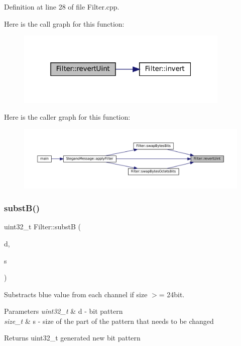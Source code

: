 Definition at line 28 of file Filter.\+cpp.

Here is the call graph for this function\+:\nopagebreak
\begin{figure}[H]
\begin{center}
\leavevmode
\includegraphics[width=289pt]{classFilter_ae4a4b081886014742d083d9a2b285981_cgraph}
\end{center}
\end{figure}
Here is the caller graph for this function\+:
\nopagebreak
\begin{figure}[H]
\begin{center}
\leavevmode
\includegraphics[width=350pt]{classFilter_ae4a4b081886014742d083d9a2b285981_icgraph}
\end{center}
\end{figure}
\mbox{\label{classFilter_a3f2bbadc0138195cebf84bd8ce8d9892}} 
\subsubsection{\texorpdfstring{substB()}{substB()}}
{\footnotesize\ttfamily uint32\+\_\+t Filter\+::substB (\begin{DoxyParamCaption}\item[{uint32\+\_\+t}]{d,  }\item[{size\+\_\+t}]{s }\end{DoxyParamCaption})\hspace{0.3cm}{\ttfamily [static]}}



Substracts blue value from each channel if size $>$= 24bit. 


\begin{DoxyParams}{Parameters}
{\em uint32\+\_\+t} & d -\/ bit pattern \\
\hline
{\em size\+\_\+t} & s -\/ size of the part of the pattern that needs to be changed \\
\hline
\end{DoxyParams}
\begin{DoxyReturn}{Returns}
uint32\+\_\+t generated new bit pattern 
\end{DoxyReturn}


